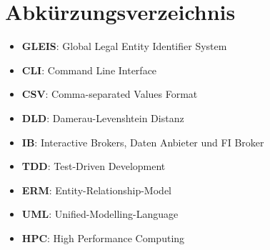 \section{Abkürzungsverzeichnis}
\begin{itemize}
	\item \textbf{GLEIS}: Global Legal Entity Identifier System
    \item \textbf{CLI}: Command Line Interface
    \item \textbf{CSV}: Comma-separated Values Format
    \item \textbf{DLD}: Damerau-Levenshtein Distanz
    \item \textbf{IB}: Interactive Brokers, Daten Anbieter und FI Broker
    \item \textbf{TDD}: Test-Driven Development
    \item \textbf{ERM}: Entity-Relationship-Model
    \item \textbf{UML}: Unified-Modelling-Language
    \item \textbf{HPC}: High Performance Computing
\end{itemize}